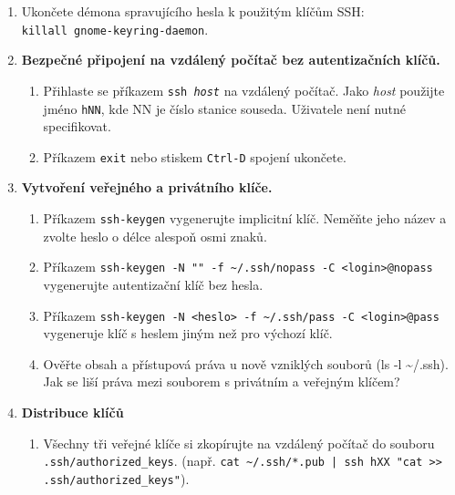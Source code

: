 \begin{enumerate}

  \item Ukončete démona spravujícího hesla k použitým klíčům SSH: \\ {\tt killall
    gnome-keyring-daemon}.

  \item {\bf Bezpečné připojení na vzdálený počítač bez autentizačních klíčů.}

    \begin{enumerate}

      \item Přihlaste se příkazem {\tt ssh {\em host}} na vzdálený počítač. Jako {\em host} použijte 
            jméno {\tt hNN}, kde NN je číslo stanice souseda. Uživatele není nutné specifikovat.

      \item Příkazem {\tt exit} nebo stiskem {\tt Ctrl-D} spojení ukončete.

    \end{enumerate}

  \item {\bf Vytvoření veřejného a privátního klíče.}

    \begin{enumerate}

      \item Příkazem {\tt ssh-keygen} vygenerujte implicitní klíč. Neměňte jeho
        název a zvolte heslo o délce alespoň osmi znaků.

      \item Příkazem \verb|ssh-keygen -N "" -f ~/.ssh/nopass -C <login>@nopass| vygenerujte autentizační klíč bez hesla.

      \item Příkazem {\tt ssh-keygen -N <heslo> -f \textasciitilde/.ssh/pass -C
        <login>@pass} vygeneruje klíč s heslem jiným než pro výchozí klíč.

      \item Ověřte obsah a přístupová práva u nově vzniklých souborů (ls -l \textasciitilde/.ssh). Jak
se liší práva mezi souborem s privátním a veřejným klíčem?

    \end{enumerate}

  \item {\bf Distribuce klíčů}

    \begin{enumerate}

      \item Všechny tři veřejné klíče si zkopírujte na vzdálený počítač do
        souboru \verb|.ssh/authorized_keys|.
        (např. {\verb&cat ~/.ssh/*.pub | ssh hXX "cat >> .ssh/authorized_keys"&}).


\end{enumerate}
\end{enumerate}
